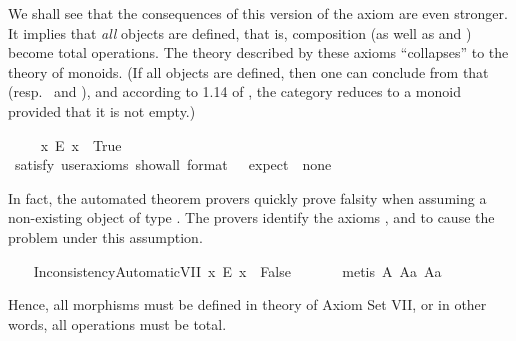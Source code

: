 \begin{isabellebody}
\begin{isamarkuptext}
We shall see that the consequences of this version of the axiom are
even stronger. It implies that \emph{all} objects are defined,
that is, composition (as well as  and ) become total operations.
The theory described by these axioms ``collapses'' to the theory of
monoids. (If all objects are defined, then one can conclude from  that 
 (resp.~ and ), 
and according to 1.14 of \cite{FreydScedrov90}, 
the category reduces to a monoid provided that it is not empty.)%
\end{isamarkuptext}\isamarkuptrue%
\ \ \isamarkupfalse%
\ \ {\isachardoublequoteopen}{\isasymexists}x{\isachardot}\ \isactrlbold {\isasymnot}{\isacharparenleft}E\ x{\isacharparenright}{\isachardoublequoteclose}\ \ True\ \ \ %
\ \isanewline
\ \ \ \ \isamarkupfalse%
\ {\isacharbrackleft}satisfy{\isacharcomma}\ user{\isacharunderscore}axioms{\isacharcomma}\ show{\isacharunderscore}all{\isacharcomma}\ format\ {\isacharequal}\ {}{\isacharcomma}\ expect\ {\isacharequal}\ none{\isacharbrackright}%
\isadelimproof
\ %
\endisadelimproof
%
\isatagproof
{}\isamarkupfalse%
%
\endisatagproof
{\isafoldproof}%
%
\isadelimproof
%
\endisadelimproof
%
\begin{isamarkuptext}%
In fact, the automated theorem provers quickly prove falsity when assuming a 
 non-existing object of type . The provers identify the axioms , 
 and  to cause the problem under this assumption.%
\end{isamarkuptext}\isamarkuptrue%
\ \ \isamarkupfalse%
\ InconsistencyAutomaticVII{\isacharcolon}\ {\isachardoublequoteopen}{\isacharparenleft}{\isasymexists}x{\isachardot}\ \isactrlbold {\isasymnot}{\isacharparenleft}E\ x{\isacharparenright}{\isacharparenright}\ \isactrlbold {\isasymrightarrow}\ False{\isachardoublequoteclose}\ \isanewline
%
\isadelimproof
\ \ \ \ %
\endisadelimproof
%
\isatagproof
{}\isamarkupfalse%
\ {\isacharparenleft}metis\ A{}\ A{}a\ A{}a{\isacharparenright}%
\endisatagproof
{\isafoldproof}%
%
\isadelimproof
%
\endisadelimproof
%
\begin{isamarkuptext}%
Hence, all morphisms must be defined in theory of Axiom Set VII, or in other 
      words, all operations must be total.%

\end{isamarkuptext}
\end{isabellebody}
